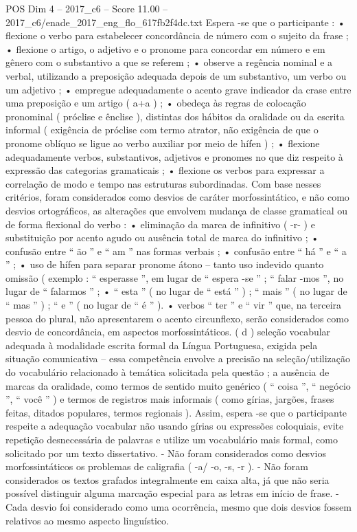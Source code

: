 \begin{textsample}{POS Dim 4 – 2017\_c6 – Score 11.00 – 2017\_c6/enade\_2017\_eng\_flo\_617fb2f4dc.txt}
Espera -se que o participante : • flexione o verbo para estabelecer concordância de número com o sujeito da frase ; • flexione o artigo, o adjetivo e o pronome para concordar em número e em gênero com o substantivo a que se referem ; • observe a regência nominal e a verbal, utilizando a preposição adequada depois de um substantivo, um verbo ou um adjetivo ; • empregue adequadamente o acento grave indicador da crase entre uma preposição e um artigo ( a+a ) ; • obedeça às regras de colocação pronominal ( próclise e ênclise ), distintas dos hábitos da oralidade ou da escrita informal ( exigência de próclise com termo atrator, não exigência de que o pronome oblíquo se ligue ao verbo auxiliar por meio de hífen ) ; • flexione adequadamente verbos, substantivos, adjetivos e pronomes no que diz respeito à expressão das categorias gramaticais ; • flexione os verbos para expressar a correlação de modo e tempo nas estruturas subordinadas.
Com base nesses critérios, foram considerados como desvios de caráter morfossintático, e não como desvios ortográficos, as alterações que envolvem mudança de classe gramatical ou de forma flexional do verbo : • eliminação da marca de infinitivo ( -r- ) e substituição por acento agudo ou ausência total de marca do infinitivo ; • confusão entre “ ão ” e “ am ” nas formas verbais ; • confusão entre “ há ” e “ a ” ; • uso de hífen para separar pronome átono – tanto uso indevido quanto omissão ( exemplo : “ esperasse ”, em lugar de “ espera -se ” ; “ falar -mos ”, no lugar de “ falarmos ” ; • “ esta ” ( no lugar de “ está ” ) ; “ mais ” ( no lugar de “ mas ” ) ; “ e ” ( no lugar de “ é ” ). • verbos “ ter ” e “ vir ” que, na terceira pessoa do plural, não apresentarem o acento circunflexo, serão considerados como desvio de concordância, em aspectos morfossintáticos. ( d ) seleção vocabular adequada à modalidade escrita formal da Língua Portuguesa, exigida pela situação comunicativa – essa competência envolve a precisão na seleção/utilização do vocabulário relacionado à temática solicitada pela questão ; a ausência de marcas da oralidade, como termos de sentido muito genérico ( “ coisa ”, “ negócio ”, “ você ” ) e termos de registros mais informais ( como gírias, jargões, frases feitas, ditados populares, termos regionais ).
Assim, espera -se que o participante respeite a adequação vocabular não usando gírias ou expressões coloquiais, evite repetição desnecessária de palavras e utilize um vocabulário mais formal, como solicitado por um texto dissertativo. - Não foram considerados como desvios morfossintáticos os problemas de caligrafia ( -a/ -o, -s, -r ). - Não foram considerados os textos grafados integralmente em caixa alta, já que não seria possível distinguir alguma marcação especial para as letras em início de frase. - Cada desvio foi considerado como uma ocorrência, mesmo que dois desvios fossem relativos ao mesmo aspecto linguístico.

\end{textsample}

